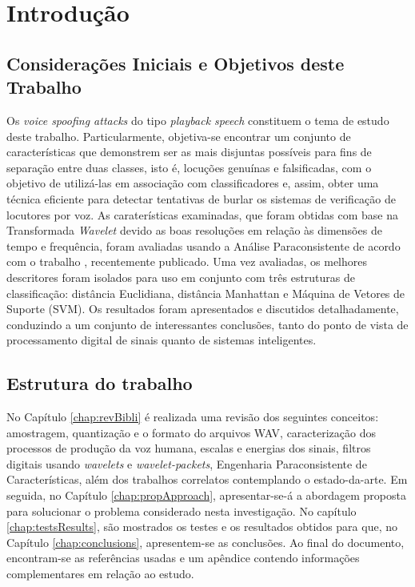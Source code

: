 \chapter{Introdução}
	\section{Considerações Iniciais e Objetivos deste Trabalho}
		\par Os \textit{voice spoofing attacks} do tipo \textit{playback speech} constituem o tema de estudo deste trabalho. Particularmente, objetiva-se encontrar um conjunto de características que demonstrem ser as mais disjuntas possíveis para fins de separação entre duas classes, isto é, locuções genuínas e falsificadas, com o objetivo de utilizá-las em associação com classificadores e, assim, obter uma técnica eficiente para detectar tentativas de burlar os sistemas de verificação de locutores por voz. As caraterísticas examinadas, que foram obtidas com base na Transformada \textit{Wavelet} devido as boas resoluções em relação às dimensões de tempo e frequência, foram avaliadas usando a Análise Paraconsistente de acordo com o trabalho \cite{8588433}, recentemente publicado. Uma vez avaliadas, os melhores descritores foram isolados para uso em conjunto com três estruturas de classificação: distância Euclidiana, distância Manhattan e Máquina de Vetores de Suporte (SVM). Os resultados foram apresentados e discutidos detalhadamente, conduzindo a um conjunto de interessantes conclusões, tanto do ponto de vista de processamento digital de sinais quanto de sistemas inteligentes. 
			
	\section{Estrutura do trabalho}
		\par No Capítulo \ref{chap:revBibli} é realizada uma revisão dos seguintes conceitos: amostragem, quantização e o formato do arquivos WAV, caracterização dos processos de produção da voz humana, escalas e energias dos sinais, filtros digitais usando \textit{wavelets} e \textit{wavelet-packets}, Engenharia Paraconsistente de Características, além dos trabalhos correlatos contemplando o estado-da-arte. Em seguida, no Capítulo \ref{chap:propApproach}, apresentar-se-á a abordagem proposta para solucionar o problema considerado nesta investigação. No capítulo \ref{chap:testsResults}, são mostrados os testes e os resultados obtidos para que, no Capítulo \ref{chap:conclusions}, apresentem-se as conclusões. Ao final do documento, encontram-se as referências usadas e um apêndice contendo informações complementares em relação ao estudo.